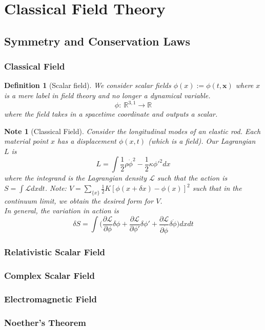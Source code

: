 \documentclass[a4paper]{article}
\newtheorem{defi}{Definition}[section]
\newtheorem{note}{Note}[section]
\theoremstyle{new}
\begin{document}
\section{Classical Field Theory}
\subsection{Symmetry and Conservation Laws}
\subsubsection{Classical Field}
\begin{defi}[Scalar field]
We consider scalar fields $\phi(x):=\phi(t,\mathbf{x})$ where $x$ is a mere label in field theory and no longer a dynamical variable. 
$$\phi:~\mathbb{R}^{3,1}\rightarrow\mathbb{R}$$
where the field takes in a spacetime coordinate and outputs a scalar.
\end{defi}
\begin{note}[Classical Field]
Consider the longitudinal modes of an elastic rod. Each material point $x$ has a displacement $\phi(x,t)$ (which is a field). Our Lagrangian $L$ is 
$$L=\int\frac{1}{2}\rho\dot{\phi}^2-\frac{1}{2}\kappa\phi'^2dx$$
where the integrand is the Lagrangian density $\mathcal{L}$ such that the action is $S=\int\mathcal{L}dxdt$. Note: $V=\sum_{\{x\}}\frac{1}{2}K[\phi(x+\delta x)-\phi(x)]^2$ such that in the continuum limit, we obtain the desired form for $V$.\\[5pt]
In general, the variation in action is
$$\delta S=\int\bigg(\frac{\partial\mathcal{L}}{\partial\phi}\delta\phi+\frac{\partial\mathcal{L}}{\partial\phi'}\delta\phi'+\frac{\partial\mathcal{L}}{\partial\dot{\phi}}\delta\dot{\phi}\bigg)dxdt$$
\end{note}
\subsubsection{Relativistic Scalar Field}
\newpage
\subsubsection{Complex Scalar Field}
\subsubsection{Electromagnetic Field}
\newpage
\subsubsection{Noether's Theorem}
\end{document}
